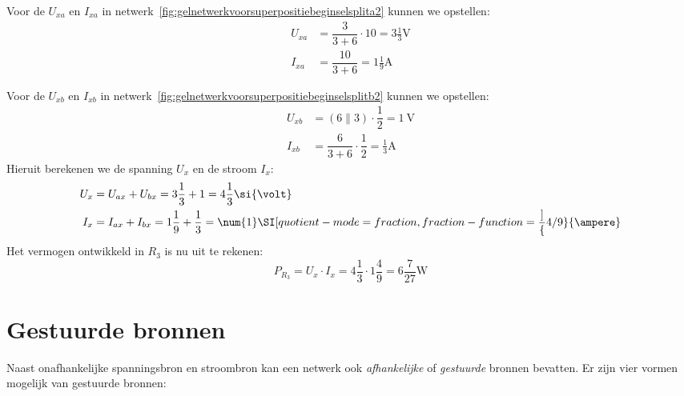 \begin{example}
Voor de $U_{xa}$ en $I_{xa}$ in netwerk~\ref{fig:gelnetwerkvoorsuperpositiebeginselsplita2} kunnen
we opstellen:
%
\begin{equation}
\begin{split}
U_{xa} &= \dfrac{\num{3}}{\num{3}+\num{6}}\cdot \num{10} = 3\frac{1}{3}\si{\volt} \\
I_{xa} &= \dfrac{\num{10}}{\num{3}+\num{6}} = 1\frac{1}{9}\si{\ampere}
\end{split}
\end{equation}

Voor de $U_{xb}$ en $I_{xb}$ in netwerk~\ref{fig:gelnetwerkvoorsuperpositiebeginselsplitb2} kunnen
we opstellen:
%
\begin{equation}
\begin{split}
U_{xb} &= (\num{6}\parallel\num{3})\cdot\dfrac{1}{2}  = \SI{1}{\volt} \\
I_{xb} &= \dfrac{\num{6}}{\num{3}+\num{6}}\cdot\dfrac{1}{2} = \frac{1}{3}\si{\ampere}
\end{split}
\end{equation}
%
Hieruit berekenen we de spanning $U_x$ en de stroom $I_x$:
\begin{equation}
\begin{split}
U_{x} &= U_{ax} + U_{bx} = 3\frac{1}{3} + 1 = 4\frac{1}{3}\si{\volt} \\
I_{x} &= I_{ax} + I_{bx} = 1\frac{1}{9} + \frac{1}{3} = \num{1}\SI[quotient-mode = fraction,fraction-function = \dfrac]{4 / 9}{\ampere} \\
\end{split}
\end{equation}
%
Het vermogen ontwikkeld in $R_3$ is nu uit te rekenen:
%
\begin{equation}
P_{R_3} = U_x\cdot I_x = 4\frac{1}{3} \cdot 1\frac{4}{9} = 6\dfrac{7}{27}\si{\watt}
\end{equation}
\end{example}

\fi

\ifgestuurdebronnen

\section{Gestuurde bronnen}

Naast onafhankelijke spanningsbron en stroombron kan een netwerk ook \textsl{afhankelijke} of \textsl{gestuurde} bronnen bevatten. Er zijn vier vormen mogelijk van gestuurde bronnen:

